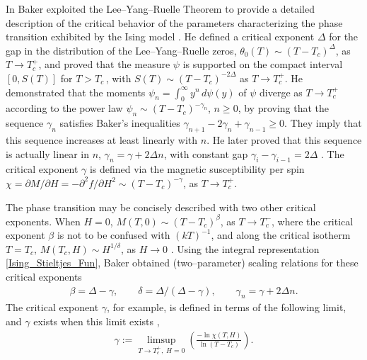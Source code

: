 \documentclass[english,12pt,jmp,graphicx]{revtex4-1}
\begin{document}
In \cite{Baker:PRB:1184,Baker-1990} Baker exploited the
Lee--Yang--Ruelle Theorem to provide a detailed description of the 
critical behavior of the parameters characterizing 
the phase transition exhibited by the Ising model
\cite{Christensen-2005}. He defined a critical 
exponent $\Delta$ for the gap in the distribution of the Lee--Yang--Ruelle
zeros, $\theta_0(T)\sim(T-T_c)^\Delta$, as $T\to T_c^+$, and proved that
the measure $\psi$ is supported on the compact interval
$[0,S(T)]$ for $T>T_c\,$, with $S(T)\sim(T-T_c)^{-2\Delta}$ as
$T\to T_c^+$. He demonstrated that the moments $\psi_n=\int_0^\infty y^n\,d\psi(y)$ of $\psi$
diverge as $T\to T_c^+$ according to the power law $\psi_n\sim(T-T_c)^{-\gamma_n}$,
$n\geq0$, by proving that the sequence $\gamma_n$ satisfies Baker's
inequalities $\gamma_{n+1}-2\gamma_n+\gamma_{n-1}\geq0$. They imply that this sequence
increases at least linearly with $n$. He later proved that this
sequence is actually linear in $n$, $\gamma_n=\gamma+2\Delta n$, with constant gap $\gamma_i-\gamma_{i-1}=2\Delta$
\cite{Baker-1990}. The critical exponent $\gamma$ is defined via the 
magnetic susceptibility per spin $\chi=\partial M/\partial H=-\partial^2f/\partial H^2\sim(T-T_c)^{-\gamma}$, as
$T\to T_c^+$. 

The phase transition may be concisely described with two
other critical exponents. When $H=0$, $M(T,0)\sim(T-T_c)^\beta$, as $T\to T_c^-$,
where the critical exponent $\beta$ is not to be confused with
$(kT)^{-1}$, and along the critical isotherm $T=T_c$, $M(T_c,H)\sim H^{1/\delta}$,
as $H\to0$ \cite{Christensen-2005,Baker-1990}. Using the integral
representation \eqref{Ising_Stieltjes_Fun}, Baker obtained 
(two--parameter) scaling relations for these critical exponents
\cite{Baker-1990} 
%
\begin{align}\label{eq:Ising_Scaling_Relations}
  \beta=\Delta-\gamma, \qquad \delta=\Delta/(\Delta-\gamma), \qquad \gamma_n=\gamma+2\Delta n.
\end{align}
%
The critical exponent $\gamma$, for example, is defined
in terms of the following limit, and $\gamma$ exists when this limit exists
\cite{Baker-1990},
% 
\begin{align}\label{eq:Critical_Exponent_Existence}
  \gamma:=\limsup_{T\to T_c^+, \;H=0}\left(\frac{-\ln \chi(T,H)}{\ln(T-T_c)}  \right).
\end{align}
%
\end{document}
